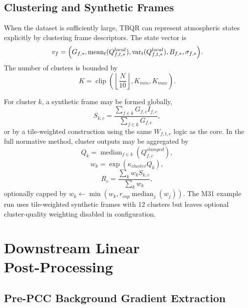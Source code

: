 \documentclass[10pt,twocolumn]{article}
\begin{document}
\subsection{Clustering and Synthetic Frames}

When the dataset is sufficiently large, TBQR can represent atmospheric states explicitly by clustering frame descriptors. The state vector is
\begin{equation}
  v_f =
  \Bigl(
  G_{f,*},
  \operatorname{mean}_t(Q_{f,t,*}^{local}),
  \operatorname{var}_t(Q_{f,t,*}^{local}),
  B_{f,*},
  \sigma_{f,*}
  \Bigr).
\end{equation}
The number of clusters is bounded by
\begin{equation}
  K = \operatorname{clip}\!\left(\left\lfloor \frac{N}{10} \right\rfloor, K_{min}, K_{max}\right).
\end{equation}

For cluster $k$, a synthetic frame may be formed globally,
\begin{equation}
  S_{k,c} = \frac{\sum_{f \in k} G_{f,c}I_{f,c}}{\sum_{f \in k} G_{f,c}},
\end{equation}
or by a tile-weighted construction using the same $W_{f,t,c}$ logic as the core. In the full normative method, cluster outputs may be aggregated by
\begin{equation}
  Q_k = \operatorname{median}_{f \in k}(Q_{f,c}^{clamped}),
\end{equation}
\begin{equation}
  w_k = \exp(\kappa_{cluster}Q_k),
\end{equation}
\begin{equation}
  R_c = \frac{\sum_k w_kS_{k,c}}{\sum_k w_k},
\end{equation}
optionally capped by $w_k \leftarrow \min(w_k, r_{cap}\operatorname{median}_j(w_j))$. The M31 example run uses tile-weighted synthetic frames with 12 clusters but leaves optional cluster-quality weighting disabled in configuration.

\section{Downstream Linear \protect \\Post-Processing}

\subsection{Pre-PCC Background Gradient Extraction}
\end{document}
